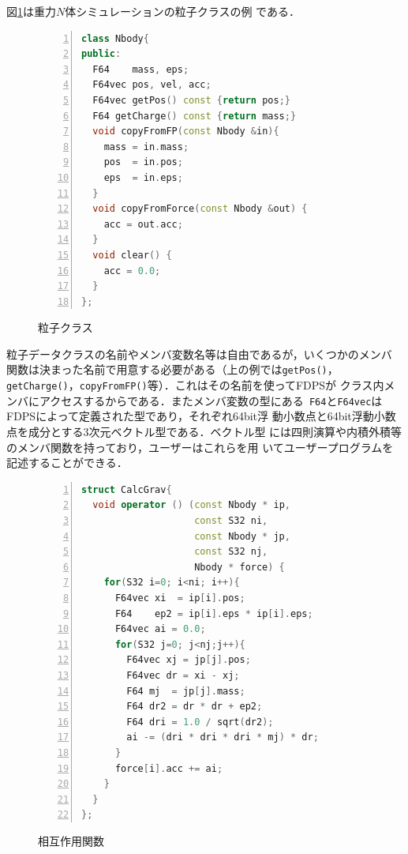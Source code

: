 \documentclass[submit,techreq,noauthor]{ipsj}
\begin{document}
図\ref{code:ptcl_class}は重力$N$体シミュレーションの粒子クラスの例
である．


\begin{figure}[!h]
\begin{lstlisting}[language=c++,numbers=left,numbersep=5pt,frame=single,basicstyle=\ttfamily]
class Nbody{
public:
  F64    mass, eps;
  F64vec pos, vel, acc;
  F64vec getPos() const {return pos;}
  F64 getCharge() const {return mass;}
  void copyFromFP(const Nbody &in){ 
    mass = in.mass;
    pos  = in.pos;
    eps  = in.eps;
  }
  void copyFromForce(const Nbody &out) {
    acc = out.acc;
  }    
  void clear() {
    acc = 0.0;
  }
};
\end{lstlisting}
\caption{粒子クラス}
\label{code:ptcl_class}
\end{figure}

粒子データクラスの名前やメンバ変数名等は自由であるが，いくつかのメンバ
関数は決まった名前で用意する必要がある（上の例では{\tt getPos()}，{\tt
    getCharge()}，{\tt copyFromFP()}等）．これはその名前を使ってFDPSが
クラス内メンバにアクセスするからである．またメンバ変数の型にある{\tt
  F64}と{\tt F64vec}はFDPSによって定義された型であり，それぞれ64bit浮
動小数点と64bit浮動小数点を成分とする3次元ベクトル型である．ベクトル型
には四則演算や内積外積等のメンバ関数を持っており，ユーザーはこれらを用
いてユーザープログラムを記述することができる．




\begin{figure}[!h]
\begin{lstlisting}[language=c++,numbers=left,numbersep=5pt,frame=single,basicstyle=\ttfamily]
struct CalcGrav{
  void operator () (const Nbody * ip,
                    const S32 ni,
                    const Nbody * jp,
                    const S32 nj,
                    Nbody * force) {
    for(S32 i=0; i<ni; i++){
      F64vec xi  = ip[i].pos;
      F64    ep2 = ip[i].eps * ip[i].eps;
      F64vec ai = 0.0;
      for(S32 j=0; j<nj;j++){
        F64vec xj = jp[j].pos;
        F64vec dr = xi - xj;
        F64 mj  = jp[j].mass;
        F64 dr2 = dr * dr + ep2;
        F64 dri = 1.0 / sqrt(dr2);                
        ai -= (dri * dri * dri * mj) * dr;
      }
      force[i].acc += ai;
    }
  }
};
\end{lstlisting}
\caption{相互作用関数}
\label{code:force}
\end{figure}
\end{document}
